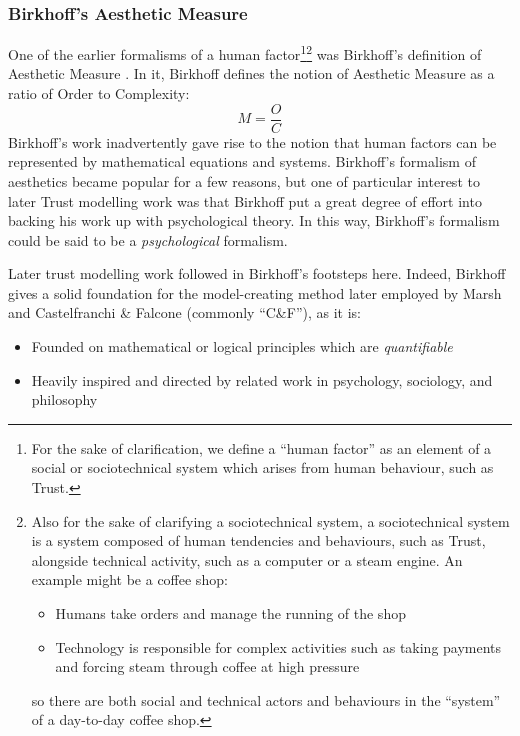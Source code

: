 \subsubsection{Birkhoff's Aesthetic Measure}\label{subsubsec:birkhoff}
One of the earlier formalisms of a human factor\footnote{For the sake of clarification, we define a ``human factor'' as an element of a social or sociotechnical system which arises from human behaviour, such as Trust.}\footnote{Also for the sake of clarifying a sociotechnical system, a sociotechnical system is a system composed of human tendencies and behaviours, such as Trust, alongside technical activity, such as a computer or a steam engine. An example might be a coffee shop: \begin{itemize}
    \item Humans take orders and manage the running of the shop
    \item Technology is responsible for complex activities such as taking payments and forcing steam through coffee at high pressure
\end{itemize} so there are both social and technical actors and behaviours in the ``system'' of a day-to-day coffee shop.} was Birkhoff's definition of Aesthetic Measure \parencite{BirkhoffAESTHETICMEASURE}. In it, Birkhoff defines the notion of Aesthetic Measure as a ratio of Order to Complexity:
\[M = \frac{O}{C}\]
Birkhoff's work inadvertently gave rise to the notion that human factors can be represented by mathematical equations and systems. Birkhoff's formalism of aesthetics became popular for a few reasons, but one of particular interest to later Trust modelling work was that Birkhoff put a great degree of effort into backing his work up with psychological theory. In this way, Birkhoff's formalism could be said to be a \emph{psychological} formalism. \par

Later trust modelling work followed in Birkhoff's footsteps here. Indeed, Birkhoff gives a solid foundation for the model-creating method later employed by Marsh \parencite{Marsh1994FormalisingConcept} and Castelfranchi \& Falcone (commonly ``C\&F''), as it is:
\begin{itemize}
    \item Founded on mathematical or logical principles which are \emph{quantifiable}
    \item Heavily inspired and directed by related work in psychology, sociology, and philosophy
\end{itemize}\par

